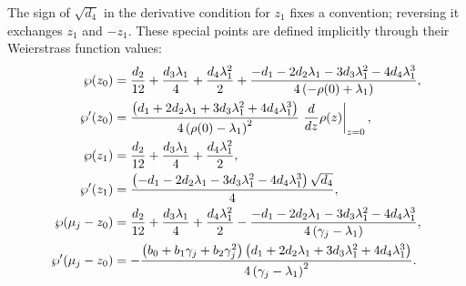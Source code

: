 \documentclass[11pt,a4paper]{article}
\begin{document}
The sign of $\sqrt{d_4}$ in the derivative condition for $z_1$ fixes a convention; reversing it exchanges $z_1$ and $-z_1$.
These special points are defined implicitly through their Weierstrass function values:
\begin{align}
\wp{\left(z_{0}\right)} &= \frac{{d}_{2}}{12} + \frac{{d}_{3} {\lambda}_{1}}{4} + \frac{{d}_{4} {\lambda}_{1}^{2}}{2} + \frac{- {d}_{1} - 2 {d}_{2} {\lambda}_{1} - 3 {d}_{3} {\lambda}_{1}^{2} - 4 {d}_{4} {\lambda}_{1}^{3}}{4 \left(- \rho{\left(0 \right)} + {\lambda}_{1}\right)}, \notag \\
\wp'{\left(z_{0}\right)} &= \frac{\left({d}_{1} + 2 {d}_{2} {\lambda}_{1} + 3 {d}_{3} {\lambda}_{1}^{2} + 4 {d}_{4} {\lambda}_{1}^{3}\right) }{4 \left(\rho{\left(0 \right)} - {\lambda}_{1}\right)^{2}}\left. \frac{d}{d z} \rho{\left(z \right)} \right|_{\substack{ z=0 }}, \notag \\
\wp{\left(z_{1}\right)} &= \frac{{d}_{2}}{12} + \frac{{d}_{3} {\lambda}_{1}}{4} + \frac{{d}_{4} {\lambda}_{1}^{2}}{2}, \notag \\
\wp'{\left(z_{1}\right)} &= \frac{\left(- {d}_{1} - 2 {d}_{2} {\lambda}_{1} - 3 {d}_{3} {\lambda}_{1}^{2} - 4 {d}_{4} {\lambda}_{1}^{3}\right) \sqrt{{d}_{4}}}{4}, \notag \\
\wp{\left({\mu}_{j} - z_{0}\right)} &= \frac{{d}_{2}}{12} + \frac{{d}_{3} {\lambda}_{1}}{4} + \frac{{d}_{4} {\lambda}_{1}^{2}}{2} - \frac{- {d}_{1} - 2 {d}_{2} {\lambda}_{1} - 3 {d}_{3} {\lambda}_{1}^{2} - 4 {d}_{4} {\lambda}_{1}^{3}}{4 \left({\gamma}_{j} - {\lambda}_{1}\right)}, \notag \\
\wp'{\left({\mu}_{j}- z_{0}\right)} &= - \frac{\left({b}_{0} + {b}_{1} {\gamma}_{j} + {b}_{2} {\gamma}_{j}^{2}\right) \left({d}_{1} + 2 {d}_{2} {\lambda}_{1} + 3 {d}_{3} {\lambda}_{1}^{2} + 4 {d}_{4} {\lambda}_{1}^{3}\right)}{4 \left({\gamma}_{j} - {\lambda}_{1}\right)^{2}}. \label{eq:wp-points}
\end{align}
\end{document}
